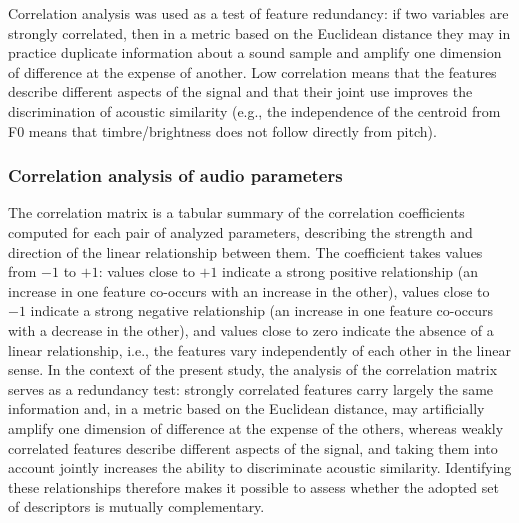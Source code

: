 \documentclass[preprint,12pt]{elsarticle}
\begin{document}
Correlation analysis was used as a test of feature redundancy: if two variables are strongly correlated, then in a metric based on the Euclidean distance they may in practice duplicate information about a sound sample and amplify one dimension of difference at the expense of another. Low correlation means that the features describe different aspects of the signal and that their joint use improves the discrimination of acoustic similarity (e.g., the independence of the centroid from F0 means that timbre/brightness does not follow directly from pitch).

\subsubsection{Correlation analysis of audio parameters}
The correlation matrix is a tabular summary of the correlation coefficients computed for each pair of analyzed parameters, describing the strength and direction of the linear relationship between them. The coefficient takes values from $-1$ to $+1$: values close to $+1$ indicate a strong positive relationship (an increase in one feature co-occurs with an increase in the other), values close to $-1$ indicate a strong negative relationship (an increase in one feature co-occurs with a decrease in the other), and values close to zero indicate the absence of a linear relationship, i.e., the features vary independently of each other in the linear sense. In the context of the present study, the analysis of the correlation matrix serves as a redundancy test: strongly correlated features carry largely the same information and, in a metric based on the Euclidean distance, may artificially amplify one dimension of difference at the expense of the others, whereas weakly correlated features describe different aspects of the signal, and taking them into account jointly increases the ability to discriminate acoustic similarity. Identifying these relationships therefore makes it possible to assess whether the adopted set of descriptors is mutually complementary.
\end{document}
